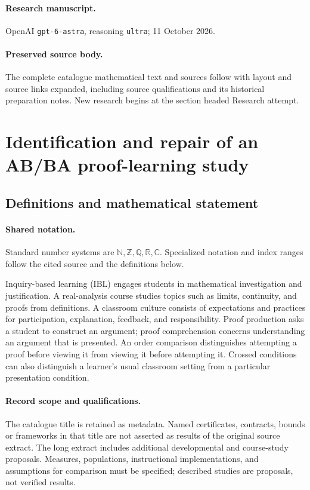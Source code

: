 \documentclass[11pt]{article}
\begin{document}
\paragraph{Research manuscript.} OpenAI \texttt{gpt-6-astra}, reasoning \texttt{ultra}; 11 October 2026.
\paragraph{Preserved source body.} The complete catalogue mathematical text and sources follow with layout and source links expanded, including source qualifications and its historical preparation notes. New research begins at the section headed Research attempt.

\section{Identification and repair of an AB/BA proof-learning study}\label{statement}

\subsection{Definitions and mathematical statement}

\paragraph{Shared notation.}Standard number systems are $\mathbb N,\mathbb Z,\mathbb Q,\mathbb R,\mathbb C$. Specialized notation and index ranges follow the cited source and the definitions below.


Inquiry-based learning (IBL) engages students in mathematical investigation and justification. A real-analysis course studies topics such as limits, continuity, and proofs from definitions. A classroom culture consists of expectations and practices for participation, explanation, feedback, and responsibility. Proof production asks a student to construct an argument; proof comprehension concerns understanding an argument that is presented. An order comparison distinguishes attempting a proof before viewing it from viewing it before attempting it. Crossed conditions can also distinguish a learner's usual classroom setting from a particular presentation condition.
\paragraph{Record scope and qualifications.}
The catalogue title is retained as metadata. Named certificates, contracts, bounds or frameworks in that title are not asserted as results of the original source extract.
The long extract includes additional developmental and course-study proposals. Measures, populations, instructional implementations, and assumptions for comparison must be specified; described studies are proposals, not verified results.
\end{document}
